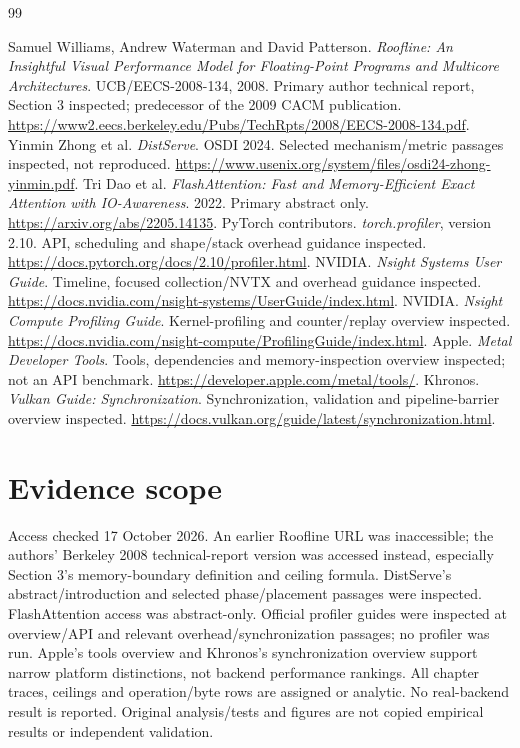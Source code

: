 \begin{thebibliography}{99}
 Samuel Williams, Andrew Waterman and David Patterson.
\emph{Roofline: An Insightful Visual Performance Model for Floating-Point
Programs and Multicore Architectures}. UCB/EECS-2008-134, 2008.
Primary author technical report, Section 3 inspected; predecessor of the
2009 CACM publication.
\url{https://www2.eecs.berkeley.edu/Pubs/TechRpts/2008/EECS-2008-134.pdf}.
 Yinmin Zhong et al. \emph{DistServe}. OSDI 2024.
Selected mechanism/metric passages inspected, not reproduced.
\url{https://www.usenix.org/system/files/osdi24-zhong-yinmin.pdf}.
 Tri Dao et al. \emph{FlashAttention: Fast and Memory-Efficient
Exact Attention with IO-Awareness}. 2022. Primary abstract only.
\url{https://arxiv.org/abs/2205.14135}.
 PyTorch contributors. \emph{torch.profiler}, version 2.10.
API, scheduling and shape/stack overhead guidance inspected.
\url{https://docs.pytorch.org/docs/2.10/profiler.html}.
 NVIDIA. \emph{Nsight Systems User Guide}. Timeline, focused
collection/NVTX and overhead guidance inspected.
\url{https://docs.nvidia.com/nsight-systems/UserGuide/index.html}.
 NVIDIA. \emph{Nsight Compute Profiling Guide}.
Kernel-profiling and counter/replay overview inspected.
\url{https://docs.nvidia.com/nsight-compute/ProfilingGuide/index.html}.
 Apple. \emph{Metal Developer Tools}. Tools, dependencies and
memory-inspection overview inspected; not an API benchmark.
\url{https://developer.apple.com/metal/tools/}.
 Khronos. \emph{Vulkan Guide: Synchronization}.
Synchronization, validation and pipeline-barrier overview inspected.
\url{https://docs.vulkan.org/guide/latest/synchronization.html}.
\end{thebibliography}

\section*{Evidence scope}
Access checked 17 October 2026. An earlier Roofline URL was inaccessible;
the authors' Berkeley 2008 technical-report version was accessed instead,
especially Section 3's memory-boundary definition and ceiling formula.
DistServe's abstract/introduction and selected phase/placement passages were
inspected. FlashAttention access was abstract-only. Official profiler guides
were inspected at overview/API and relevant overhead/synchronization passages;
no profiler was run. Apple's tools overview and Khronos's synchronization
overview support narrow platform distinctions, not backend performance rankings.
All chapter traces, ceilings and operation/byte rows are assigned or analytic.
No real-backend result is reported. Original analysis/tests and figures are
not copied empirical results or independent validation.
